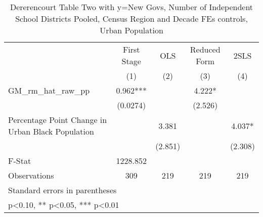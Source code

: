 \begin{table}[htbp]\centering
\def\sym#1{\ifmmode^{#1}\else\(^{#1}\)\fi}
\caption{Dererencourt Table Two with y=New Govs, Number of Independent School Districts  Pooled, Census Region and Decade FEs controls, Urban Population}
\begin{tabular}{l*{4}{c}}
\toprule
                    & First Stage   &         OLS   &Reduced Form   &        2SLS   \\
                    &\multicolumn{1}{c}{(1)}   &\multicolumn{1}{c}{(2)}   &\multicolumn{1}{c}{(3)}   &\multicolumn{1}{c}{(4)}   \\
\midrule
GM\_rm\_hat\_raw\_pp    &       0.962***&               &       4.222*  &               \\
                    &    (0.0274)   &               &     (2.526)   &               \\
\addlinespace
Percentage Point Change in Urban Black Population&               &       3.381   &               &       4.037*  \\
                    &               &     (2.851)   &               &     (2.308)   \\
\midrule
F-Stat              &    1228.852   &               &               &               \\
Observations        &         309   &         219   &         219   &         219   \\
\bottomrule
\multicolumn{5}{l}{\footnotesize Standard errors in parentheses}\\
\multicolumn{5}{l}{\footnotesize * p<0.10, ** p<0.05, *** p<0.01}\\
\end{tabular}
\end{table}
